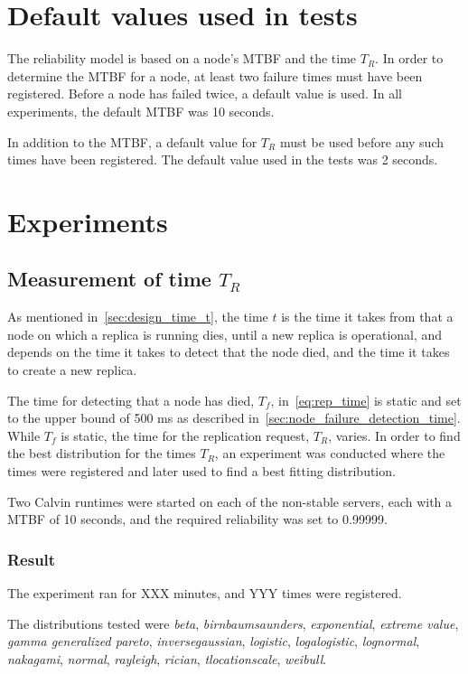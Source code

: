 \documentclass{cslthse-msc}
\begin{document}
\section{Default values used in tests} \label{subsec:eval_default_values}
The reliability model is based on a node's MTBF and the time $T_R$. In order to determine the MTBF for a node, at least two failure times must have been registered. Before a node has failed twice, a default value is used. In all experiments, the default MTBF was 10 seconds.

In addition to the MTBF, a default value for $T_R$ must be used before any such times have been registered. The default value used in the tests was 2 seconds.

\section{Experiments}

\subsection{Measurement of time $T_R$} \label{sec:eval_time_t}
As mentioned in~\cref{sec:design_time_t}, the time $t$ is the time it takes from that a node on which a replica is running dies, until a new replica is operational, and depends on the time it takes to detect that the node died, and the time it takes to create a new replica. 

The time for detecting that a node has died, $T_f$, in~\cref{eq:rep_time} is static and set to the upper bound of 500 ms as described in~\cref{sec:node_failure_detection_time}. While $T_f$ is static, the time for the replication request, $T_R$, varies. In order to find the best distribution for the times $T_R$, an experiment was conducted where the times were registered and later used to find a best fitting distribution.

Two Calvin runtimes were started on each of the non-stable servers, each with a MTBF of 10 seconds, and the required reliability was set to 0.99999.

\subsubsection*{Result}
The experiment ran for XXX minutes, and YYY times were registered.

The distributions tested were \emph{beta}, \emph{birnbaumsaunders}, \emph{exponential}, \emph{extreme value}, \emph{gamma generalized pareto}, \emph{inversegaussian}, \emph{logistic}, \emph{logalogistic}, \emph{lognormal}, \emph{nakagami}, \emph{normal}, \emph{rayleigh}, \emph{rician}, \emph{tlocationscale}, \emph{weibull}.
\end{document}
